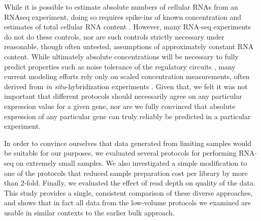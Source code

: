 While it is possible to estimate absolute numbers of cellular RNAs from an RNAseq experiment, doing so requires spike-ins of known concentration and estimates of total cellular RNA content \cite{Mortazavi:2008jj,Lin_2012}. However, many RNA-seq experiments do not do these controls, nor are such controls strictly necessary under reasonable, though often untested, assumptions of approximately constant RNA content. While ultimately absolute concentrations will be necessary to fully predict properties such as noise tolerance of the regulatory circuits \cite{Gregor:2007du,Gregor:2005jn}, many current modeling efforts rely only on scaled concentration measurements, often derived from {\em in situ}-hybridization experiments \cite{Garcia:2013fs,Ilsley:2013fk,He:2010ix}.  Given that, we felt it was not important that different protocols should necessarily agree on any particular expression value for a given gene, nor are we fully convinced that absolute expression of any particular gene can truly reliably be predicted in a particular experiment.

In order to convince ourselves that data generated from limiting samples would be suitable for our purposes, we evaluated several protocols for performing RNA-seq on extremely small samples.  We also investigated a simple modification to one of the protocols that reduced sample preparation cost per library by more than 2-fold.  Finally, we evaluated the effect of read depth on quality of the data.  This study provides a single, consistent comparison of these diverse approaches, and shows that in fact all data from the low-volume protocols we examined are usable in similar contexts to the earlier bulk approach.
